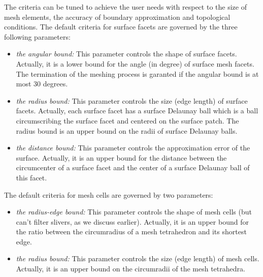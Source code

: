 The criteria can  be tuned  to achieve the user needs with respect to
the size of mesh elements, the accuracy of boundary approximation
and topological conditions.
The default criteria  for surface facets are governed by the three following
parameters:
%
%
%
\begin{itemize}
\item \emph{the angular bound:} This parameter controls the shape of  
  surface facets. Actually, it is a lower bound for the angle (in degree) of
   surface mesh facets. The termination  of the meshing process is
garanted  if the angular bound is at most 30
  degrees. 
\item \emph{the radius bound:}  This parameter controls the size (edge
  length) of surface facets. Actually, each surface facet has 
a surface Delaunay ball which is a ball circumscribing the surface facet and
  centered on the surface patch.
 The radius bound is an upper 
  bound on the radii of surface Delaunay balls.
 \item \emph{the distance bound:}  This parameter controls the approximation error of the surface.
 Actually, it is an upper bound for the distance between the circumcenter
 of a surface facet and the center of a surface Delaunay ball of this facet.
\end{itemize}

The default criteria for mesh cells are governed by two parameters:
\begin{itemize}
\item \emph{the radius-edge bound:}   This parameter controls the
  shape of mesh cells (but can't filter slivers, as we discuss earlier).
 Actually, it is an upper bound for the ratio
 between the circumradius of a 
   mesh tetrahedron and its shortest edge.
\item \emph{the radius bound:}  This parameter controls the size (edge length) of 
  mesh cells. Actually, it is an upper bound on the circumradii of the
 mesh tetrahedra.
\end{itemize}

